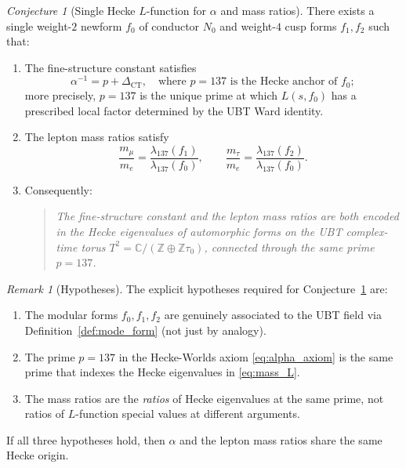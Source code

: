 \documentclass[12pt,a4paper]{article}
\theoremstyle{remark}
\newtheorem{remark}[theorem]{Remark}
\newtheorem{conjecture}[theorem]{Conjecture}
\newcommand{\C}{\mathbb{C}}
\newcommand{\Z}{\mathbb{Z}}
\begin{document}
\begin{conjecture}[Single Hecke $L$-function for $\alpha$ and mass ratios]
\label{conj:unified_L}
There exists a single weight-$2$ newform $f_0$ of conductor $N_0$ and
weight-$4$ cusp forms $f_1,f_2$ such that:
\begin{enumerate}[label=(\roman*)]
  \item The fine-structure constant satisfies
        \begin{equation}
          \label{eq:alpha_L}
          \alpha^{-1} = p + \Delta_{\mathrm{CT}},
          \quad\text{where } p=137 \text{ is the Hecke anchor of } f_0;
        \end{equation}
        more precisely, $p=137$ is the unique prime at which $L(s,f_0)$
        has a prescribed local factor determined by the UBT Ward identity.
  \item The lepton mass ratios satisfy
        \begin{equation}
          \label{eq:mass_L}
          \frac{m_\mu}{m_e} = \frac{\lambda_{137}(f_1)}{\lambda_{137}(f_0)},
          \qquad
          \frac{m_\tau}{m_e} = \frac{\lambda_{137}(f_2)}{\lambda_{137}(f_0)}.
        \end{equation}
  \item Consequently:
        \begin{quote}
          \emph{The fine-structure constant and the lepton mass ratios are
          both encoded in the Hecke eigenvalues of automorphic forms on the
          UBT complex-time torus $T^2=\C/(\Z\oplus\Z\tau_0)$, connected
          through the same prime $p=137$.}
        \end{quote}
\end{enumerate}
\end{conjecture}

\begin{remark}[Hypotheses]
The explicit hypotheses required for Conjecture~\ref{conj:unified_L} are:
\begin{enumerate}[label=(H\arabic*)]
  \item The modular forms $f_0,f_1,f_2$ are genuinely associated to the
        UBT field via Definition~\ref{def:mode_form} (not just by analogy).
  \item The prime $p=137$ in the Hecke-Worlds axiom \eqref{eq:alpha_axiom}
        is the same prime that indexes the Hecke eigenvalues in
        \eqref{eq:mass_L}.
  \item The mass ratios are the \emph{ratios} of Hecke eigenvalues at
        the same prime, not ratios of $L$-function special values at
        different arguments.
\end{enumerate}
If all three hypotheses hold, then $\alpha$ and the lepton mass ratios
share the same Hecke origin.
\end{remark}
\end{document}
